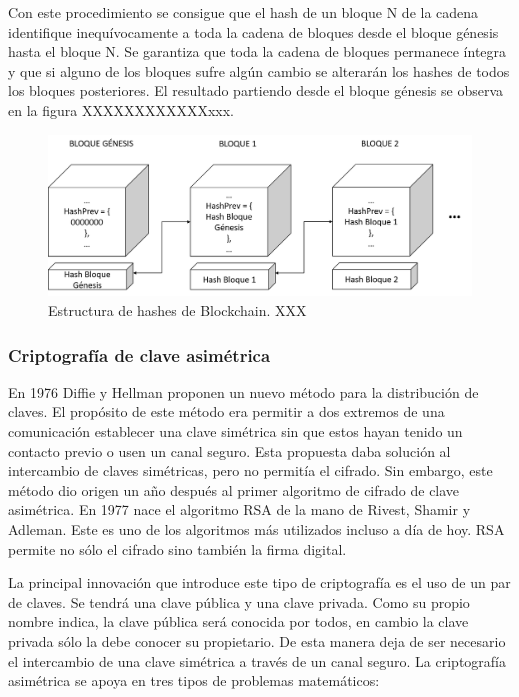 Con este procedimiento se consigue que el hash de un bloque N de la cadena identifique inequívocamente a toda la cadena de bloques desde el bloque génesis hasta el bloque N. Se garantiza que toda la cadena de bloques permanece íntegra y que si alguno de los bloques sufre algún cambio se alterarán los hashes de todos los bloques posteriores. El resultado partiendo desde el bloque génesis se observa en la figura XXXXXXXXXXXXxxx.\newline

\begin{figure}
	\centering
	\includegraphics[width=1\textwidth]{imagenes/PrevHashes.PNG}
	\caption{\label{fig1}Estructura de hashes de Blockchain. XXX}
\end{figure}

\subsubsection{Criptografía de clave asimétrica}
En 1976 Diffie y Hellman proponen un nuevo método para la distribución de claves. El propósito de este método era permitir a dos extremos de una comunicación establecer una clave simétrica sin que estos hayan tenido un contacto previo o usen un canal seguro. Esta propuesta daba solución al intercambio de claves simétricas, pero no permitía el cifrado. Sin embargo, este método dio origen un año después al primer algoritmo de cifrado de clave asimétrica. En 1977 nace el algoritmo RSA de la mano de Rivest, Shamir y Adleman. Este es uno de los algoritmos más utilizados incluso a día de hoy. RSA permite no sólo el cifrado sino también la firma digital. \newline

La principal innovación que introduce este tipo de criptografía es el uso de un par de claves. Se tendrá una clave pública y una clave privada. Como su propio nombre indica, la clave pública será conocida por todos, en cambio la clave privada sólo la debe conocer su propietario. De esta manera deja de ser necesario el intercambio de una clave simétrica a través de un canal seguro.
La criptografía asimétrica se apoya en tres tipos de problemas matemáticos:

